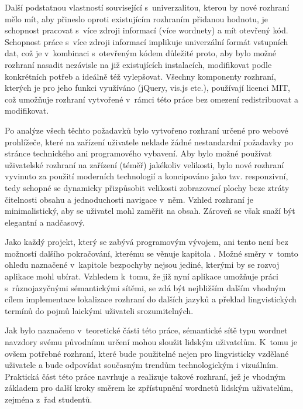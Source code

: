 \documentclass[a4paper,11pt,openany,twoside]{book}
\newcommand{\itNameRef}[1]{\textit{\nameref{#1}}}
\begin{document}
			Další podstatnou vlastností související s~univerzalitou, kterou by nové rozhraní mělo mít, aby přineslo oproti existujícím rozhraním přidanou hodnotu, je schopnost pracovat s~více zdroji informací (více wordnety) a mít otevřený kód. Schopnost práce s~více zdroji informací implikuje univerzální formát vstupních dat, což je v~kombinaci s~otevřeným kódem důležité proto, aby bylo možné rozhraní nasadit nezávisle na již existujících instalacích, modifikovat podle konkrétních potřeb a ideálně též vylepšovat. Všechny komponenty rozhraní, kterých je pro jeho funkci využíváno (jQuery, vis.js etc.), používají licenci MIT, což umožňuje rozhraní vytvořené v~rámci této práce bez omezení redistribuovat a modifikovat. 

			Po analýze všech těchto požadavků bylo vytvořeno rozhraní určené pro webové prohlížeče, které na zařízení uživatele neklade žádné nestandardní požadavky  po stránce technického ani programového vybavení. Aby bylo možné používat uživatelské rozhraní na zařízení (téměř) jakékoliv velikosti, bylo nové rozhraní vyvinuto za použití moderních technologií a koncipováno jako tzv. responzivní, tedy schopné se dynamicky přizpůsobit velikosti zobrazovací plochy beze ztráty čitelnosti obsahu a jednoduchosti navigace v~něm. Vzhled rozhraní je minimalistický, aby se uživatel mohl zaměřit na obsah. Zároveň se však snaží být elegantní a nadčasový.

			Jako každý projekt, který se zabývá programovým vývojem, ani tento není bez možností dalšího pokračování, kterému se věnuje kapitola \itNameRef{cha:co-se-nestihlo}. Možné směry v~tomto ohledu naznačené v~kapitole bezpochyby nejsou jediné, kterými by se rozvoj aplikace mohl ubírat. Vzhledem k~tomu, že již nyní aplikace umožňuje práci s~různojazyčnými sémantickými sítěmi, se zdá být nejbližším dalším vhodným cílem implementace lokalizace rozhraní do dalších jazyků a překlad lingvistických termínů do pojmů laickými uživateli srozumitelných.

			Jak bylo naznačeno v~teoretické části této práce, sémantické sítě typu wordnet navzdory svému původnímu určení mohou sloužit lidským uživatelům. K~tomu je ovšem potřebné rozhraní, které bude použitelné nejen pro lingvisticky vzdělané uživatele a bude odpovídat současným trendům technologickým i vizuálním. Praktická část této práce navrhuje a realizuje takové rozhraní, jež je vhodným základem pro další kroky směrem ke zpřístupnění wordnetů lidským uživatelům, zejména z~řad studentů.
\end{document}
